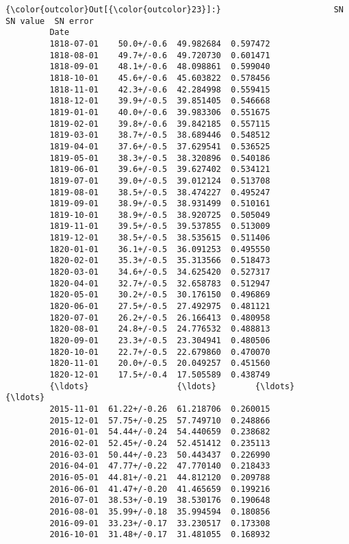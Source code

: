 \documentclass[11pt]{article}
\begin{document}
\begin{Verbatim}[commandchars=\\\{\}]
{\color{outcolor}Out[{\color{outcolor}23}]:}                       SN   SN value  SN error
         Date                                         
         1818-07-01    50.0+/-0.6  49.982684  0.597472
         1818-08-01    49.7+/-0.6  49.720730  0.601471
         1818-09-01    48.1+/-0.6  48.098861  0.599040
         1818-10-01    45.6+/-0.6  45.603822  0.578456
         1818-11-01    42.3+/-0.6  42.284998  0.559415
         1818-12-01    39.9+/-0.5  39.851405  0.546668
         1819-01-01    40.0+/-0.6  39.983306  0.551675
         1819-02-01    39.8+/-0.6  39.842185  0.557115
         1819-03-01    38.7+/-0.5  38.689446  0.548512
         1819-04-01    37.6+/-0.5  37.629541  0.536525
         1819-05-01    38.3+/-0.5  38.320896  0.540186
         1819-06-01    39.6+/-0.5  39.627402  0.534121
         1819-07-01    39.0+/-0.5  39.012124  0.513708
         1819-08-01    38.5+/-0.5  38.474227  0.495247
         1819-09-01    38.9+/-0.5  38.931499  0.510161
         1819-10-01    38.9+/-0.5  38.920725  0.505049
         1819-11-01    39.5+/-0.5  39.537855  0.513009
         1819-12-01    38.5+/-0.5  38.535615  0.511406
         1820-01-01    36.1+/-0.5  36.091253  0.495550
         1820-02-01    35.3+/-0.5  35.313566  0.518473
         1820-03-01    34.6+/-0.5  34.625420  0.527317
         1820-04-01    32.7+/-0.5  32.658783  0.512947
         1820-05-01    30.2+/-0.5  30.176150  0.496869
         1820-06-01    27.5+/-0.5  27.492975  0.481121
         1820-07-01    26.2+/-0.5  26.166413  0.480958
         1820-08-01    24.8+/-0.5  24.776532  0.488813
         1820-09-01    23.3+/-0.5  23.304941  0.480506
         1820-10-01    22.7+/-0.5  22.679860  0.470070
         1820-11-01    20.0+/-0.5  20.049257  0.451560
         1820-12-01    17.5+/-0.4  17.505589  0.438749
         {\ldots}                  {\ldots}        {\ldots}       {\ldots}
         2015-11-01  61.22+/-0.26  61.218706  0.260015
         2015-12-01  57.75+/-0.25  57.749710  0.248866
         2016-01-01  54.44+/-0.24  54.440659  0.238682
         2016-02-01  52.45+/-0.24  52.451412  0.235113
         2016-03-01  50.44+/-0.23  50.443437  0.226990
         2016-04-01  47.77+/-0.22  47.770140  0.218433
         2016-05-01  44.81+/-0.21  44.812120  0.209788
         2016-06-01  41.47+/-0.20  41.465659  0.199216
         2016-07-01  38.53+/-0.19  38.530176  0.190648
         2016-08-01  35.99+/-0.18  35.994594  0.180856
         2016-09-01  33.23+/-0.17  33.230517  0.173308
         2016-10-01  31.48+/-0.17  31.481055  0.168932

\end{Verbatim}
\end{document}
